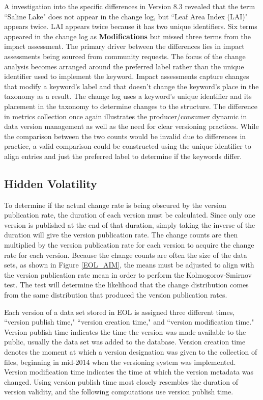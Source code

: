 A investigation into the specific differences in Version 8.3 revealed that the term ``Saline Lake" does not appear in the change log, but ``Leaf Area Index (LAI)" appears twice.
LAI appears twice because it has two unique identifiers.
Six terms appeared in the change log as \textbf{Modifications} but missed three terms from the impact assessment.
The primary driver between the differences lies in impact assessments being sourced from community requests.
The focus of the change analysis becomes arranged around the preferred label rather than the unique identifier used to implement the keyword.
Impact assessments capture changes that modify a keyword's label and that doesn't change the keyword's place in the taxonomy as a result.
The change log uses a keyword's unique identifier and its placement in the taxonomy to determine changes to the structure.
The difference in metrics collection once again illustrates the producer/consumer dynamic in data version management as well as the need for clear versioning practices.
While the comparison between the two counts would be invalid due to differences in practice, a valid comparison could be constructed using the unique identifier to align entries and just the preferred label to determine if the keywords differ.

\subsection{Hidden Volatility}

To determine if the actual change rate is being obscured by the version publication rate, the duration of each version must be calculated.
Since only one version is published at the end of that duration, simply taking the inverse of the duration will give the version publication rate.
The change counts are then multiplied by the version publication rate for each version to acquire the change rate for each version.
Because the change counts are often the size of the data sets, as shown in Figure \ref{EOL_AIM}, the means must be adjusted to align with the version publication rate mean in order to perform the Kolmogorov-Smirnov test.
The test will determine the likelihood that the change distribution comes from the same distribution that produced the version publication rates.

Each version of a data set stored in EOL is assigned three different times, ``version publish time," ``version creation time," and ``version modification time." 
Version publish time indicates the time the version was made available to the public, usually the data set was added to the database.  
Version creation time denotes the moment at which a version designation was given to the collection of files, beginning in mid-2014 when the versioning system was implemented.  
Version modification time indicates the time at which the version metadata was changed.  
Using version publish time most closely resembles the duration of version validity, and the following computations use version publish time.

